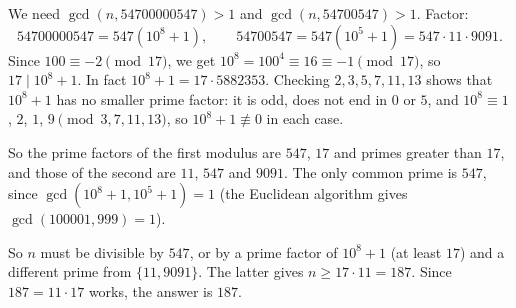 We need $\gcd(n,54700000547)>1$ and $\gcd(n,54700547)>1$. Factor:
\[54700000547=547\left(10^8+1\right),\qquad54700547=547\left(10^5+1\right)=547\cdot11\cdot9091.\]
Since $100\equiv-2\pmod{17}$, we get $10^8=100^4\equiv16\equiv-1\pmod{17}$, so $17\mid10^8+1$. In fact $10^8+1=17\cdot5882353$. Checking $2,3,5,7,11,13$ shows that $10^8+1$ has no smaller prime factor: it is odd, does not end in $0$ or $5$, and $10^8\equiv1$, $2$, $1$, $9\pmod{3,7,11,13}$, so $10^8+1\not\equiv0$ in each case.

So the prime factors of the first modulus are $547$, $17$ and primes greater than $17$, and those of the second are $11$, $547$ and $9091$. The only common prime is $547$, since $\gcd\left(10^8+1,10^5+1\right)=1$ (the Euclidean algorithm gives $\gcd(100001,999)=1$).

So $n$ must be divisible by $547$, or by a prime factor of $10^8+1$ (at least $17$) and a different prime from $\{11,9091\}$. The latter gives $n\ge17\cdot11=187$. Since $187=11\cdot17$ works, the answer is $\boxed{187}$.
